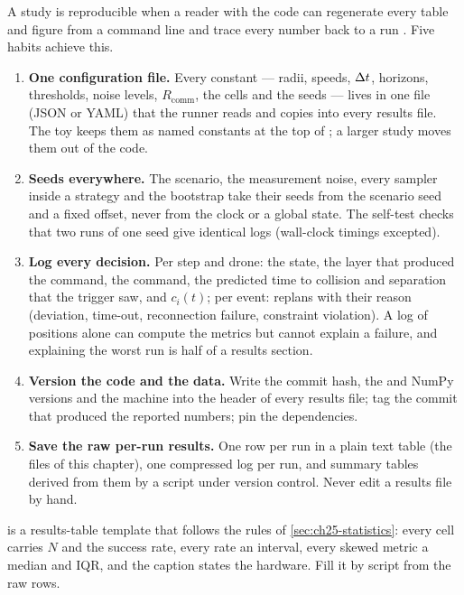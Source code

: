 A study is reproducible when a reader with the code
can regenerate every table and figure from a command line and trace every
number back to a run \cite{peng2011reproducible}. Five habits achieve this.
\begin{enumerate}
  \item \textbf{One configuration file.} Every constant --- radii, speeds,
        $\Delta t$, horizons, thresholds, noise levels, $R_{\mathrm{comm}}$, the
        cells and the seeds --- lives in one file (JSON or YAML) that the
        runner reads and copies into every results file. The toy keeps them
        as named constants at the top of ; a
        larger study moves them out of the code.
  \item \textbf{Seeds everywhere.} The scenario, the measurement noise,
        every sampler inside a strategy and the bootstrap take their seeds
        from the scenario seed and a fixed offset, never from the clock or a
        global state. The self-test checks that two runs of one seed give
        identical logs (wall-clock timings excepted).
  \item \textbf{Log every decision.} Per step and drone: the state, the
        layer that produced the command, the command, the predicted time to
        collision and separation that the trigger saw, and $c_i(t)$; per
        event: replans with their reason (deviation, time-out, reconnection
        failure, constraint violation). A log of positions alone can compute
        the metrics but cannot explain a failure, and explaining the worst
        run is half of a results section.
  \item \textbf{Version the code and the data.} Write the commit hash, the
        \python and NumPy versions and the machine into the header of every
        results file; tag the commit that produced the reported numbers;
        pin the dependencies.
  \item \textbf{Save the raw per-run results.} One row per run in a plain
        text table (the  files of this chapter), one compressed
        log per run, and summary tables derived from them by a script under
        version control. Never edit a results file by hand.
\end{enumerate}

 is a results-table template that follows the rules
of \cref{sec:ch25-statistics}: every cell carries $N$ and the success rate,
every rate an interval, every skewed metric a median and IQR, and the
caption states the hardware. Fill it by script from the raw rows.

